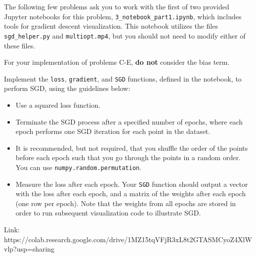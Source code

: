 The following few problems ask you to work with the first of two provided Jupyter notebooks for this problem, \texttt{3_notebook_part1.ipynb}, which includes tools for gradient descent visualization. This notebook utilizes the files \texttt{sgd_helper.py} and \texttt{multiopt.mp4}, but you should not need to modify either of these files. 

For your implementation of problems C-E, \textbf{do not} consider the bias term.

\begin{problem}[8]
  Implement the \texttt{loss}, \texttt{gradient}, and \texttt{SGD} functions, defined in the notebook, to perform SGD, using the guidelines below:

  \begin{itemize}
    \item Use a squared loss function.
    \item Terminate the SGD process after a specified number of epochs, where each epoch performs one SGD iteration for each point in the dataset.
    \item It is recommended, but not required, that you shuffle the order of the points before each epoch such that you go through the points in a random order. You can use \texttt{numpy.random.permutation}.
    \item Measure the loss after each epoch. Your \texttt{SGD} function should output a vector with the loss after each epoch, and a matrix of the weights after each epoch (one row per epoch). Note that the weights from all epochs are stored in order to run subsequent visualization code to illustrate SGD.
  \end{itemize}
\end{problem}
\begin{solution}
Link: https://colab.research.google.com/drive/1MZ15tqVFjR3xL8t2GTASMCyoZ4XlWvlp?usp=sharing
\end{solution}

